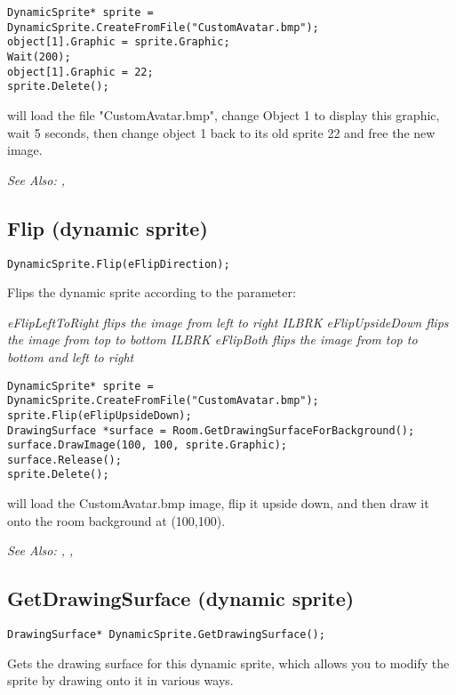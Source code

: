 \begin{verbatim}
DynamicSprite* sprite = DynamicSprite.CreateFromFile("CustomAvatar.bmp");
object[1].Graphic = sprite.Graphic;
Wait(200);
object[1].Graphic = 22;
sprite.Delete();
\end{verbatim}
will load the file "CustomAvatar.bmp", change Object 1 to display this graphic, wait 5
seconds, then change object 1 back to its old sprite 22 and free the new image.

\it{See Also:} ,


\subsection{Flip (dynamic sprite)}\label{DynamicSprite.Flip}%

\begin{verbatim}
DynamicSprite.Flip(eFlipDirection);
\end{verbatim}
Flips the dynamic sprite according to the parameter:

\it{eFlipLeftToRight} flips the image from left to right ILBRK
\it{eFlipUpsideDown} flips the image from top to bottom ILBRK
\it{eFlipBoth} flips the image from top to bottom and left to right

\begin{verbatim}
DynamicSprite* sprite = DynamicSprite.CreateFromFile("CustomAvatar.bmp");
sprite.Flip(eFlipUpsideDown);
DrawingSurface *surface = Room.GetDrawingSurfaceForBackground();
surface.DrawImage(100, 100, sprite.Graphic);
surface.Release();
sprite.Delete();
\end{verbatim}
will load the CustomAvatar.bmp image, flip it upside down, and then
draw it onto the room background at (100,100).

\it{See Also:} ,
,


\subsection{GetDrawingSurface (dynamic sprite)}\label{DynamicSprite.GetDrawingSurface}%

\begin{verbatim}
DrawingSurface* DynamicSprite.GetDrawingSurface();
\end{verbatim}
Gets the drawing surface for this dynamic sprite, which allows you to modify the sprite by
drawing onto it in various ways.

